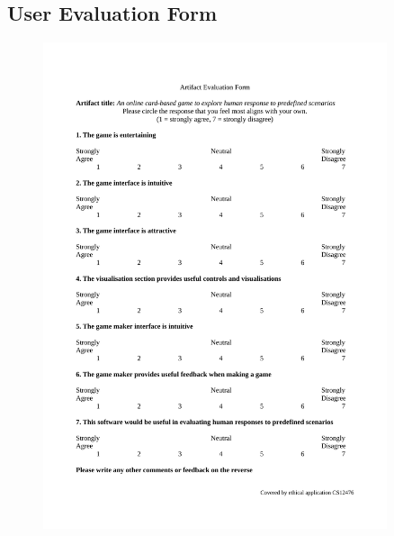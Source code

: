 \documentclass[]{report}
\begin{document}
\begin{appendices}
  \section{User Evaluation Form}
  \begin{figure}[!h]
    \centering
    \includegraphics[width=0.9\textwidth]{./appendices/feedback.pdf}\label{appendix:artifact_eval}
  \end{figure}
\end{appendices}
\end{document}
